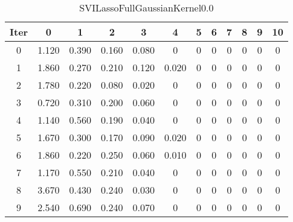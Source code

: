\begin{table}
	\begin{center}
		\begin{tabular}{|c|c|c|c|c|c|c|c|c|c|c|c|}
			\hline
			Iter & 0 & 1 & 2 & 3 & 4 & 5 & 6 & 7 & 8 & 9 & 10 \\
			\hline
			0 & 1.120 & 0.390 & 0.160 & 0.080 & 0 & 0 & 0 & 0 & 0 & 0 & 0 \\
			\hline
			1 & 1.860 & 0.270 & 0.210 & 0.120 & 0.020 & 0 & 0 & 0 & 0 & 0 & 0 \\
			\hline
			2 & 1.780 & 0.220 & 0.080 & 0.020 & 0 & 0 & 0 & 0 & 0 & 0 & 0 \\
			\hline
			3 & 0.720 & 0.310 & 0.200 & 0.060 & 0 & 0 & 0 & 0 & 0 & 0 & 0 \\
			\hline
			4 & 1.140 & 0.560 & 0.190 & 0.040 & 0 & 0 & 0 & 0 & 0 & 0 & 0 \\
			\hline
			5 & 1.670 & 0.300 & 0.170 & 0.090 & 0.020 & 0 & 0 & 0 & 0 & 0 & 0 \\
			\hline
			6 & 1.860 & 0.220 & 0.250 & 0.060 & 0.010 & 0 & 0 & 0 & 0 & 0 & 0 \\
			\hline
			7 & 1.170 & 0.550 & 0.210 & 0.040 & 0 & 0 & 0 & 0 & 0 & 0 & 0 \\
			\hline
			8 & 3.670 & 0.430 & 0.240 & 0.030 & 0 & 0 & 0 & 0 & 0 & 0 & 0 \\
			\hline
			9 & 2.540 & 0.690 & 0.240 & 0.070 & 0 & 0 & 0 & 0 & 0 & 0 & 0 \\
			\hline
		\end{tabular}
	\end{center}
	\caption{SVILassoFullGaussianKernel0.0}
\end{table}